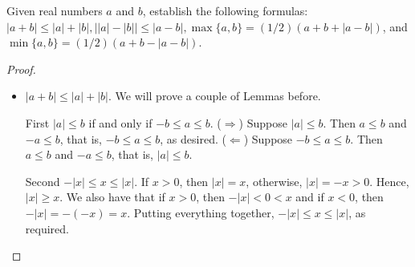 \begin{exercise}{17}
Given real numbers $a$ and $b$, establish the following formulas: $\lvert a+b\rvert\leq\lvert a\rvert +\lvert b\rvert, \lvert\lvert a\rvert -\lvert b\rvert\rvert \leq\lvert a-b\rvert, \max\{a,b\}=(1/2)(a+b+\lvert a-b\rvert)$, and $\min\{a,b\}=(1/2)(a+b-\lvert a-b\rvert)$.
\end{exercise}
\begin{proof}
\begin{itemize}
    \item $\lvert a+b\rvert\leq\lvert a\rvert +\lvert b\rvert$. We will prove a couple of Lemmas before. 
 
     First $\lvert a\rvert \leq b$ if and only if $-b\leq a\leq b$. ($\Rightarrow$) Suppose $\lvert a\rvert\leq b$. Then $a\leq b$ and $-a\leq b$, that is, $-b\leq a\leq b$, as desired. ($\Leftarrow$) Suppose $-b\leq a\leq b$. Then $a\leq b$ and $-a\leq b$, that is, $\lvert a\rvert\leq b$. 
    
     Second $-\lvert x\rvert\leq x\leq\lvert x\rvert$. If $x>0$, then $\lvert x\rvert =x$, otherwise, $\lvert x\rvert =-x>0$. Hence, $\lvert x\rvert\geq x$. We also have that if $x>0$, then $-\lvert x\rvert<0<x$ and if $x<0$, then $-\lvert x\rvert =-(-x) =x$. Putting everything together, $-\lvert x\rvert\leq x\leq\lvert x\rvert$, as required.
    

\end{itemize}
\end{proof}
